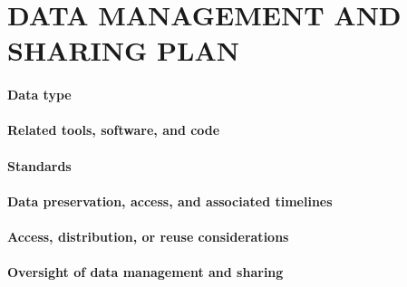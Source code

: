 \documentclass[11pt,letterpaper]{article}
\begin{document}
\section{DATA MANAGEMENT AND SHARING PLAN}

\paragraph{Data type}

\paragraph{Related tools, software, and code}

\paragraph{Standards}

\paragraph{Data preservation, access, and associated timelines}

\paragraph{Access, distribution, or reuse considerations}

\paragraph{Oversight of data management and sharing}
\end{document}
